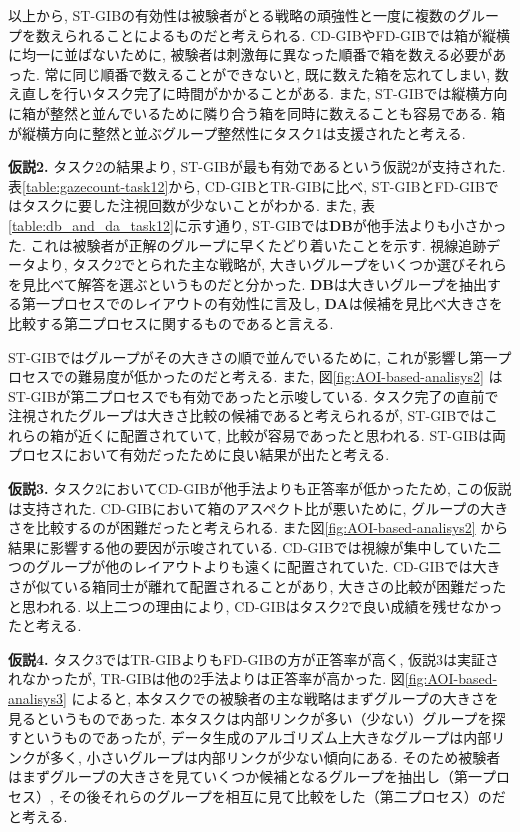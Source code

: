 \documentclass{kuee}
\begin{document}
以上から, ST-GIBの有効性は被験者がとる戦略の頑強性と一度に複数のグループを数えられることによるものだと考えられる.
CD-GIBやFD-GIBでは箱が縦横に均一に並ばないために, 被験者は刺激毎に異なった順番で箱を数える必要があった.
常に同じ順番で数えることができないと, 既に数えた箱を忘れてしまい, 数え直しを行いタスク完了に時間がかかることがある.
また, ST-GIBでは縦横方向に箱が整然と並んでいるために隣り合う箱を同時に数えることも容易である.
箱が縦横方向に整然と並ぶグループ整然性にタスク1は支援されたと考える.

{\bf 仮説2.} タスク2の結果より, ST-GIBが最も有効であるという仮説2が支持された.
表\ref{table:gazecount-task12}から, CD-GIBとTR-GIBに比べ, ST-GIBとFD-GIBではタスクに要した注視回数が少ないことがわかる.
また, 表\ref{table:db_and_da_task12}に示す通り, ST-GIBでは{\bf DB}が他手法よりも小さかった.
これは被験者が正解のグループに早くたどり着いたことを示す.
視線追跡データより, タスク2でとられた主な戦略が, 大きいグループをいくつか選びそれらを見比べて解答を選ぶというものだと分かった.
{\bf DB}は大きいグループを抽出する第一プロセスでのレイアウトの有効性に言及し, {\bf DA}は候補を見比べ大きさを比較する第二プロセスに関するものであると言える.

ST-GIBではグループがその大きさの順で並んでいるために, これが影響し第一プロセスでの難易度が低かったのだと考える.
また, 図\ref{fig:AOI-based-analisys2} はST-GIBが第二プロセスでも有効であったと示唆している.
タスク完了の直前で注視されたグループは大きさ比較の候補であると考えられるが, ST-GIBではこれらの箱が近くに配置されていて, 比較が容易であったと思われる.
ST-GIBは両プロセスにおいて有効だったために良い結果が出たと考える.

{\bf 仮説3.} タスク2においてCD-GIBが他手法よりも正答率が低かったため, この仮説は支持された.
CD-GIBにおいて箱のアスペクト比が悪いために, グループの大きさを比較するのが困難だったと考えられる.
また図\ref{fig:AOI-based-analisys2} から結果に影響する他の要因が示唆されている.
CD-GIBでは視線が集中していた二つのグループが他のレイアウトよりも遠くに配置されていた.
CD-GIBでは大きさが似ている箱同士が離れて配置されることがあり, 大きさの比較が困難だったと思われる.
以上二つの理由により, CD-GIBはタスク2で良い成績を残せなかったと考える.

{\bf 仮説4.} タスク3ではTR-GIBよりもFD-GIBの方が正答率が高く, 仮説3は実証されなかったが, TR-GIBは他の2手法よりは正答率が高かった.
図\ref{fig:AOI-based-analisys3} によると, 本タスクでの被験者の主な戦略はまずグループの大きさを見るというものであった.
本タスクは内部リンクが多い（少ない）グループを探すというものであったが, データ生成のアルゴリズム上大きなグループは内部リンクが多く, 小さいグループは内部リンクが少ない傾向にある.
そのため被験者はまずグループの大きさを見ていくつか候補となるグループを抽出し（第一プロセス）, その後それらのグループを相互に見て比較をした（第二プロセス）のだと考える.
\end{document}
